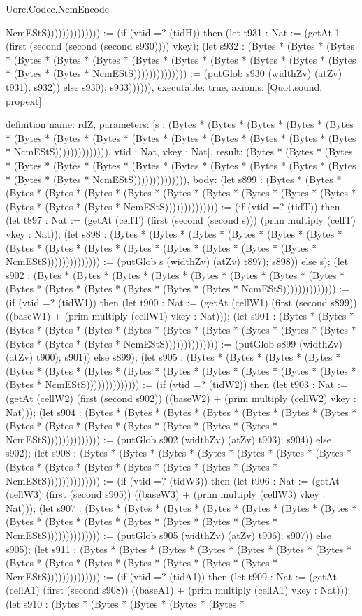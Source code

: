 \begin{lexlean}{Uorc.Codec.NcmEncode}
\begin{semanticmodule}
{NcmEStS)))))))))))))) := (if (vtid =? (tidH)) then (let t931 : Nat := (getAt 1 (first (second (second (second s930)))) vkey); (let s932 : (Bytes * (Bytes * (Bytes * (Bytes * (Bytes * (Bytes * (Bytes * (Bytes * (Bytes * (Bytes * (Bytes * (Bytes * (Bytes * (Bytes * NcmEStS)))))))))))))) := (putGlob s930 (widthZv) (atZv) t931); s932)) else s930); s933)))))),
  executable: true,
  axioms: [Quot.sound, propext]
}

definition{
  name: rdZ,
  parameters: [s : (Bytes * (Bytes * (Bytes * (Bytes * (Bytes * (Bytes * (Bytes * (Bytes * (Bytes * (Bytes * (Bytes * (Bytes * (Bytes * (Bytes * NcmEStS)))))))))))))), vtid : Nat, vkey : Nat],
  result: (Bytes * (Bytes * (Bytes * (Bytes * (Bytes * (Bytes * (Bytes * (Bytes * (Bytes * (Bytes * (Bytes * (Bytes * (Bytes * (Bytes * NcmEStS)))))))))))))),
  body: (let s899 : (Bytes * (Bytes * (Bytes * (Bytes * (Bytes * (Bytes * (Bytes * (Bytes * (Bytes * (Bytes * (Bytes * (Bytes * (Bytes * (Bytes * NcmEStS)))))))))))))) := (if (vtid =? (tidT)) then (let t897 : Nat := (getAt (cellT) (first (second (second s))) (prim multiply (cellT) vkey : Nat)); (let s898 : (Bytes * (Bytes * (Bytes * (Bytes * (Bytes * (Bytes * (Bytes * (Bytes * (Bytes * (Bytes * (Bytes * (Bytes * (Bytes * (Bytes * NcmEStS)))))))))))))) := (putGlob s (widthZv) (atZv) t897); s898)) else s); (let s902 : (Bytes * (Bytes * (Bytes * (Bytes * (Bytes * (Bytes * (Bytes * (Bytes * (Bytes * (Bytes * (Bytes * (Bytes * (Bytes * (Bytes * NcmEStS)))))))))))))) := (if (vtid =? (tidW1)) then (let t900 : Nat := (getAt (cellW1) (first (second s899)) ((baseW1) + (prim multiply (cellW1) vkey : Nat))); (let s901 : (Bytes * (Bytes * (Bytes * (Bytes * (Bytes * (Bytes * (Bytes * (Bytes * (Bytes * (Bytes * (Bytes * (Bytes * (Bytes * (Bytes * NcmEStS)))))))))))))) := (putGlob s899 (widthZv) (atZv) t900); s901)) else s899); (let s905 : (Bytes * (Bytes * (Bytes * (Bytes * (Bytes * (Bytes * (Bytes * (Bytes * (Bytes * (Bytes * (Bytes * (Bytes * (Bytes * (Bytes * NcmEStS)))))))))))))) := (if (vtid =? (tidW2)) then (let t903 : Nat := (getAt (cellW2) (first (second s902)) ((baseW2) + (prim multiply (cellW2) vkey : Nat))); (let s904 : (Bytes * (Bytes * (Bytes * (Bytes * (Bytes * (Bytes * (Bytes * (Bytes * (Bytes * (Bytes * (Bytes * (Bytes * (Bytes * (Bytes * NcmEStS)))))))))))))) := (putGlob s902 (widthZv) (atZv) t903); s904)) else s902); (let s908 : (Bytes * (Bytes * (Bytes * (Bytes * (Bytes * (Bytes * (Bytes * (Bytes * (Bytes * (Bytes * (Bytes * (Bytes * (Bytes * (Bytes * NcmEStS)))))))))))))) := (if (vtid =? (tidW3)) then (let t906 : Nat := (getAt (cellW3) (first (second s905)) ((baseW3) + (prim multiply (cellW3) vkey : Nat))); (let s907 : (Bytes * (Bytes * (Bytes * (Bytes * (Bytes * (Bytes * (Bytes * (Bytes * (Bytes * (Bytes * (Bytes * (Bytes * (Bytes * (Bytes * NcmEStS)))))))))))))) := (putGlob s905 (widthZv) (atZv) t906); s907)) else s905); (let s911 : (Bytes * (Bytes * (Bytes * (Bytes * (Bytes * (Bytes * (Bytes * (Bytes * (Bytes * (Bytes * (Bytes * (Bytes * (Bytes * (Bytes * NcmEStS)))))))))))))) := (if (vtid =? (tidA1)) then (let t909 : Nat := (getAt (cellA1) (first (second s908)) ((baseA1) + (prim multiply (cellA1) vkey : Nat))); (let s910 : (Bytes * (Bytes * (Bytes * (Bytes * (Bytes * }
\end{semanticmodule}
\end{lexlean}
